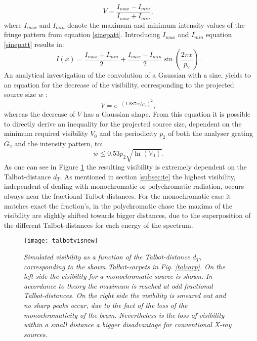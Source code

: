 \begin{equation} \label{visibility}
V = \frac{I_{max}-I_{min}}{I_{max}+I_{min}},
\end{equation}
where $I_{max}$ and $I_{min}$ denote the maximum and minimum intensity values of the fringe pattern from equation \ref{sinepatt}. Introducing $I_{max}$ and $I_{min}$ equation \ref{sinepatt} results in:
\begin{equation}
I(x) = \frac{I_{max} + I_{min}}{2} +\frac{I_{max} - I_{min}}{2} \sin(\frac{2 \pi x}{p_{2}}).
\end{equation}
An analytical investigation of the convolution of a Gaussian with a sine, yields to an equation for the decrease of the visibility, corresponding to the projected source size $w$ \citep{WeitkampPfeiffer2006}:
\begin{equation}\label{visi}
V = e^{-(1.887w/p_{2})^{2}},
\end{equation}
whereas the decrease of $V$ has a Gaussian shape. From this equation it is possible to directly derive an inequality for the projected source size, dependent on the minimum required visibility $V_{0}$ and the periodicity $p_{2}$ of both the analyser grating $G_{2}$ and the intensity pattern, to:
\begin{equation} \label{w}
w \leq 0.53 p_{2} \sqrt{\ln(V_{0})}.
\end{equation}
As one can see in Figure \ref{talvis} the resulting visibility is extremely dependent on the Talbot-distance $d_{T}$. As mentioned in section \ref{subsec:te} the highest visibility, independent of dealing with monochromatic or polychromatic radiation, occurs always near the fractional Talbot-distances. For the monochromatic case it matches exact the fraction's, in the polychromatic chase the maxima of the visibility are slightly shifted towards bigger distances, due to the superposition of the different Talbot-distances for each energy of the spectrum. 
\begin{figure}[h]
	\begin{center}
		\texttt{[image: talbotvisnew]}
	\end{center}
	\caption[Simulated visibility as function of Talbot-distance $d_{T}$]{\textit{Simulated visibility as a function of the Talbot-distance $d_{T}$, corresponding to the shown Talbot-carpets in Fig. \ref{talcarp}. On the left side the visibility for a monochromatic source is shown. In accordance to theory the maximum is reached at odd fractional Talbot-distances. On the right side the visibility is smeared out and no sharp peaks occur, due to the fact of the loss of the monochromaticity of the beam. Nevertheless is the loss of visibility within a small distance a bigger disadvantage for conventional X-ray sources.}}  
	\label{talvis}
\end{figure}
